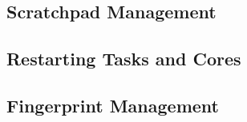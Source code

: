 	
	

\subsection{Scratchpad Management}
\subsection{Restarting Tasks and Cores}
\subsection{Fingerprint Management}




